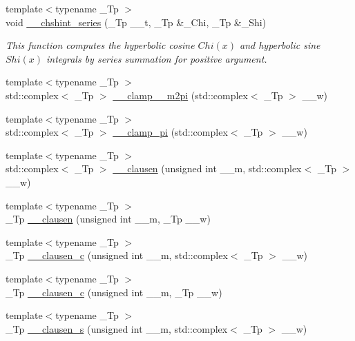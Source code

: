 \begin{DoxyCompactItemize}
{\footnotesize template$<$typename \+\_\+\+Tp $>$ }\\void \hyperlink{namespacestd_1_1____detail_a16055b6e4baa35ffe5c6d9495d9d0158}{\+\_\+\+\_\+chshint\+\_\+series} (\+\_\+\+Tp \+\_\+\+\_\+t, \+\_\+\+Tp \&\+\_\+\+Chi, \+\_\+\+Tp \&\+\_\+\+Shi)
\begin{DoxyCompactList}\small\item\em This function computes the hyperbolic cosine $ Chi(x) $ and hyperbolic sine $ Shi(x) $ integrals by series summation for positive argument. \end{DoxyCompactList}\item 
{\footnotesize template$<$typename \+\_\+\+Tp $>$ }\\std\+::complex$<$ \+\_\+\+Tp $>$ \hyperlink{namespacestd_1_1____detail_a49702394cf9b45acfa5b84f232078a9b}{\+\_\+\+\_\+clamp\+\_\+\_\+m2pi} (std\+::complex$<$ \+\_\+\+Tp $>$ \+\_\+\+\_\+w)
\item 
{\footnotesize template$<$typename \+\_\+\+Tp $>$ }\\std\+::complex$<$ \+\_\+\+Tp $>$ \hyperlink{namespacestd_1_1____detail_afc1fa8ae4623bdc71b3bf21671f68e38}{\+\_\+\+\_\+clamp\+\_\+pi} (std\+::complex$<$ \+\_\+\+Tp $>$ \+\_\+\+\_\+w)
\item 
{\footnotesize template$<$typename \+\_\+\+Tp $>$ }\\std\+::complex$<$ \+\_\+\+Tp $>$ \hyperlink{namespacestd_1_1____detail_a260f2c50d0164a55dab6a95217ced893}{\+\_\+\+\_\+clausen} (unsigned int \+\_\+\+\_\+m, std\+::complex$<$ \+\_\+\+Tp $>$ \+\_\+\+\_\+w)
\item 
{\footnotesize template$<$typename \+\_\+\+Tp $>$ }\\\+\_\+\+Tp \hyperlink{namespacestd_1_1____detail_a12dab8bfc7bc5554fe0db5d1777d9887}{\+\_\+\+\_\+clausen} (unsigned int \+\_\+\+\_\+m, \+\_\+\+Tp \+\_\+\+\_\+w)
\item 
{\footnotesize template$<$typename \+\_\+\+Tp $>$ }\\\+\_\+\+Tp \hyperlink{namespacestd_1_1____detail_a06b95eeefe47e8899e2e0a6bbd3ad31b}{\+\_\+\+\_\+clausen\+\_\+c} (unsigned int \+\_\+\+\_\+m, std\+::complex$<$ \+\_\+\+Tp $>$ \+\_\+\+\_\+w)
\item 
{\footnotesize template$<$typename \+\_\+\+Tp $>$ }\\\+\_\+\+Tp \hyperlink{namespacestd_1_1____detail_a44f2a2f49402b847c8408da5b18f8107}{\+\_\+\+\_\+clausen\+\_\+c} (unsigned int \+\_\+\+\_\+m, \+\_\+\+Tp \+\_\+\+\_\+w)
\item 
{\footnotesize template$<$typename \+\_\+\+Tp $>$ }\\\+\_\+\+Tp \hyperlink{namespacestd_1_1____detail_a19bb52bc473e5c3811281acbbdefa869}{\+\_\+\+\_\+clausen\+\_\+s} (unsigned int \+\_\+\+\_\+m, std\+::complex$<$ \+\_\+\+Tp $>$ \+\_\+\+\_\+w)

\end{DoxyCompactItemize}
